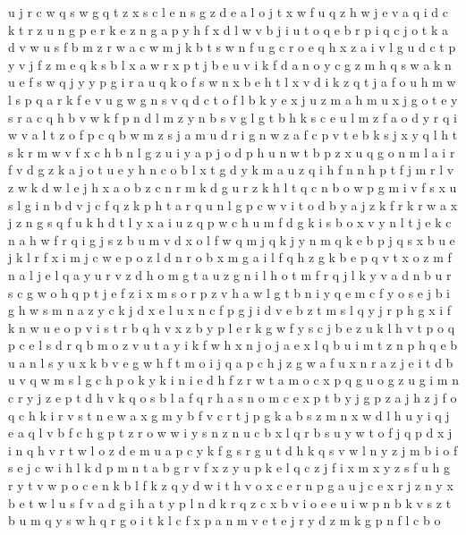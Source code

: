\documentclass{article}
\begin{document}
u j r c w q s
w g q t z x s c l e
n s g z d e a l o j t x w f u q
z h
w j e v a q i d c k t r z u n g p
e
r k e z n g a p y h f x d l w v b j i u t o q
e b r p i q c j o t k a d v w
u s f b m z r w
a c w
m j k b t s w n f u g c r o e q h x z a i v l
g u d c t p y v j f z m e q k s b l x a w
r x p t j b e u v i k f d a n o y c g z m h q s w
a k n u e f s w q j y
y p g i r a u q k o f s w n x b e h t l
x v d i k z q t j a f o u h m w l s p
q
a r k f e v u g
w g n s v q d c t o f l b k y e x j u z m a h
m
u x j g o t e y s r a c q h b v w k f p n d l m z
y n b s v g l
g t b h k s c e u l m z f a o d y r q i w v
a l t z o f p c q b w
m z s j a
m u d r i g n w z a f c p v t e b k s j x y q l h
t s k r m w v f x c h b n l g z u i y a p j o d
p h u n
w t b p z x u q g o n m l a i r f v
d g z k a j o t u e y h n
c o b l x t g d y k m a u z q i h f n
n h p t f j m r l v z w k
d w l e
j h x a o b z c n r m k d g u
r z k h l t q c n b o w p g m i v f s x u
s l g i n b d v j c f q z k p h
t a r
q u n l g p c w v i t o d b y a j z k f r
k r w a x j z n g s q f u
k h d t l y x a i u z
q p w c h u m f d g k i s b o x v y n l t j
e k c n a h w f r q i g j s z b u m v d x o l
f w q m j
q k
j y n m q
k e b p j q s x
b u e j k l r f
x i m j c w e p o z l d n r
o b x m g a i l f q h z
g k b e p q v t x o z m f n a
l j
e l q a y u r v z d h o m g t
a u z g n i l h o t m f r q j
l k y v a d n b u r s c g w o h q p t j e f z i x m
s o r p z v h a w l g t b n i y q e m
c f y o s e j
b i g h w s m n a z y c k j d x e l u
x n c f p g j i
d v e b z t m s l q y j r p h g x i f k n w u
e o p v i s t r b q
h v x z b y p l e r k
g w f y s c j b e z u k l h v t p o q
p c e l s d r q b m o z v u t a y i k f w h x n j
o j a e x l q b u i m t z n p
h q e b u a
n l s y u x k b v e g w h f t m o i j q a p c
h j z g w a f u
x n r a z j e i t d b u v q w m s l g c h p o k y
k i
n i e d h f z r w t a m o c x p q g u
o g z
u g i m n c r y j z e p t d h v k q o s b l a f
q r h a s n o m c e x p t b y j g
p z a j h
z j f o q c h k i r v s t n e w a x g m y b
f v c r t j p g k a b s z m n x w d l h u y i q
j e a q l v b f c h g p t z r o w
w i y s n
z n u c b x l q
r b s u y w t o f j q p
d
x j i n q h v r t w l o z d e m u a p c y k f g s
r g u t d h k q s v w l n y z j m b i o f
s e j c w i h l k d p m n t a b g r v f x z y u
p k e l q c z j f i x m
x y z s f
u h g r y t v w p o c e n k
b l f k z q y d w i t h v o x c e r n p g a u j
c e x r j
z n y x b e t w l u s f v a d g i
h a t y p l n d k r q z c x b v i o e
e u i w p n b k v
s z t b u m q
y s w h q r g o i t k l c f x p a n m v e
t e j r y d z m k g p n f l c b o
\end{document}
